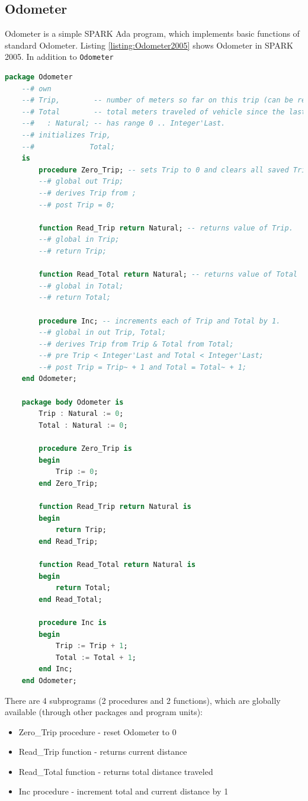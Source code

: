 \subsection{Odometer}
\label{pcapumpimpl:beagleboard:odometer}

Odometer is a simple SPARK Ada program, which implements basic functions of standard Odometer. Listing \ref{listing:Odometer2005} shows Odometer in SPARK 2005. In addition to \lstinline{Odometer}

\singlespacing
\begin{lstlisting}[language=ada, frame=single, gobble=0, caption={SPARK 2005 code: Odometer}]
	package Odometer
	--# own
	--# Trip,        -- number of meters so far on this trip (can be reset to 0).
	--# Total        -- total meters traveled of vehicle since the last factory-reset.
	--#   : Natural; -- has range 0 .. Integer'Last.
	--# initializes Trip,
	--#             Total;
	is
	    procedure Zero_Trip; -- sets Trip to 0 and clears all saved Trip marks.
	    --# global out Trip;
	    --# derives Trip from ;
	    --# post Trip = 0;
	    
	    function Read_Trip return Natural; -- returns value of Trip.
	    --# global in Trip;
	    --# return Trip;
	    
	    function Read_Total return Natural; -- returns value of Total
	    --# global in Total;
	    --# return Total;
	    
	    procedure Inc; -- increments each of Trip and Total by 1.
	    --# global in out Trip, Total;
	    --# derives Trip from Trip & Total from Total;
	    --# pre Trip < Integer'Last and Total < Integer'Last;
	    --# post Trip = Trip~ + 1 and Total = Total~ + 1;	    
	end Odometer;

	package body Odometer is
	    Trip : Natural := 0;
	    Total : Natural := 0;
	    
	    procedure Zero_Trip is
	    begin
	        Trip := 0;
	    end Zero_Trip;
	    
	    function Read_Trip return Natural is
	    begin
	        return Trip;
	    end Read_Trip;
	    
	    function Read_Total return Natural is
	    begin
	        return Total;
	    end Read_Total;
	    
	    procedure Inc is
	    begin
	        Trip := Trip + 1;
	        Total := Total + 1;
	    end Inc;	    
	end Odometer;
\end{lstlisting} 
\label{listing:Odometer2005}
\doublespacing

There are 4 subprograms (2 procedures and 2 functions), which are globally available (through other packages and program units):
\begin{itemize}
    \item Zero\_Trip procedure - reset Odometer to 0
    \item Read\_Trip function - returns current distance
    \item Read\_Total function - returns total distance traveled
    \item Inc procedure - increment total and current distance by 1
\end{itemize}

